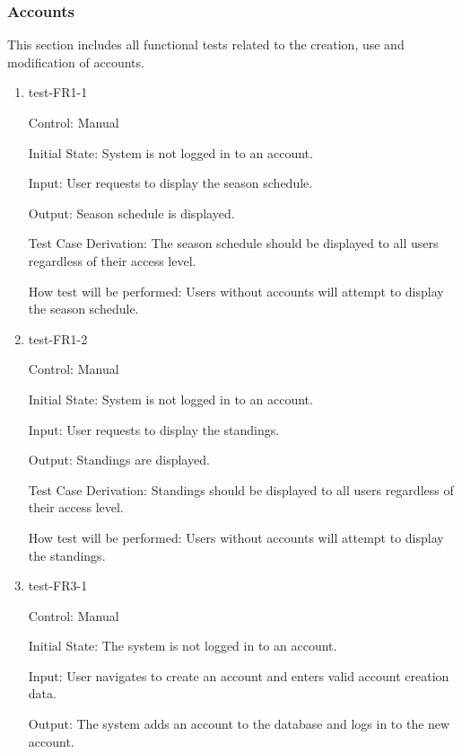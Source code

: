 \documentclass[12pt, titlepage]{article}
\begin{document}
\subsubsection{Accounts}

This section includes all functional tests related to the creation, use and
modification of accounts.

\begin{enumerate}

  \item{test-FR1-1\\}


  Control: Manual
           
  Initial State: System is not logged in to an account.
           
  Input: User requests to display the season schedule.
           
  Output: Season schedule is displayed.
 
  Test Case Derivation: The season schedule should be displayed to all users
  regardless of their access level.
 
  How test will be performed: Users without accounts will attempt to display
  the season schedule.

  \item{test-FR1-2\\}


  Control: Manual
           
  Initial State: System is not logged in to an account.
           
  Input: User requests to display the standings.
           
  Output: Standings are displayed.
 
  Test Case Derivation: Standings should be displayed to all users
  regardless of their access level.
 
  How test will be performed: Users without accounts will attempt to display
  the standings.

  \item{test-FR3-1\\}

  Control: Manual
            
  Initial State: The system is not logged in to an account.
            
  Input: User navigates to create an account and enters valid account creation
  data.
            
  Output: The system adds an account to the database and logs in to the new
  account.
  

\end{enumerate}
\end{document}
